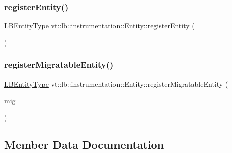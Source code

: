 \subsubsection{\texorpdfstring{register\+Entity()}{registerEntity()}}
{\footnotesize\ttfamily \hyperlink{namespacevt_a92ec26fb6644cd0ba7eb0ee70c96bee5}{L\+B\+Entity\+Type} vt\+::lb\+::instrumentation\+::\+Entity\+::register\+Entity (\begin{DoxyParamCaption}{ }\end{DoxyParamCaption})\hspace{0.3cm}{\ttfamily [static]}}

\mbox{\label{structvt_1_1lb_1_1instrumentation_1_1_entity_ab9258411ac1a88ee64fc0eb2a9183430}} 
\subsubsection{\texorpdfstring{register\+Migratable\+Entity()}{registerMigratableEntity()}}
{\footnotesize\ttfamily \hyperlink{namespacevt_a92ec26fb6644cd0ba7eb0ee70c96bee5}{L\+B\+Entity\+Type} vt\+::lb\+::instrumentation\+::\+Entity\+::register\+Migratable\+Entity (\begin{DoxyParamCaption}\item[{\hyperlink{structvt_1_1lb_1_1instrumentation_1_1_entity_a40dd6e30c20027d66b9193323d9e0cb0}{Migratable\+Type} $\ast$}]{mig }\end{DoxyParamCaption})\hspace{0.3cm}{\ttfamily [static]}}



\subsection{Member Data Documentation}
\mbox{\label{structvt_1_1lb_1_1instrumentation_1_1_entity_a954c797480b06ad1f85643802a35141e}} 
